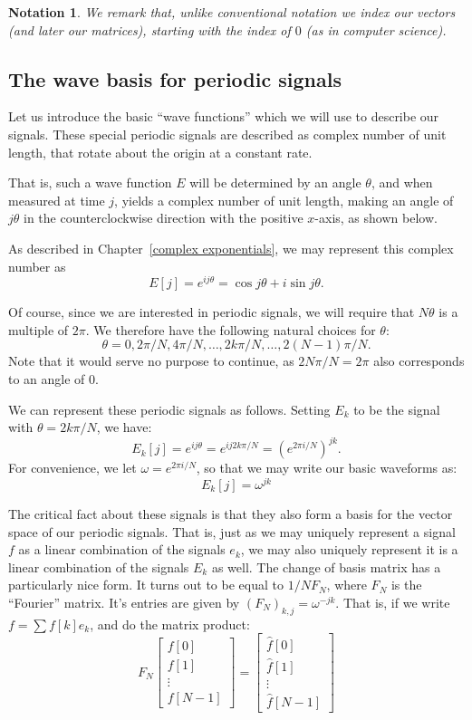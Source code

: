 \documentclass[12pt]{report}
\theoremstyle{plain}
\newtheorem{notn}[thm]{Notation}
\begin{document}
\begin{notn}
We remark that, unlike conventional notation we index our vectors (and later our matrices), starting with the index of $0$ (as in computer science).
\end{notn}

\subsection{The wave basis for periodic signals}

Let us introduce the basic ``wave functions'' which we will use to describe our signals. These special periodic signals are described as complex number of unit length, that rotate about the origin at a constant rate.

That is, such a wave function $E$ will be determined by an angle $\theta$, and when measured at time $j$, yields a complex number of unit length, making an angle of $j\theta$ in the counterclockwise direction with the positive $x$-axis, as shown below.

As described in Chapter~\ref{complex exponentials}, we may represent this complex number as 
\[E[j] = e^{ij\theta} = \cos{j\theta} + i \sin{j \theta}.\]

Of course, since we are interested in periodic signals, we will require that $N\theta$ is a multiple of $2\pi$. We therefore have the following natural choices for $\theta$:
\[\theta = 0, 2 \pi/N, 4 \pi / N, \ldots, 2k\pi/N, \ldots, 2(N-1)\pi/N.\]
Note that it would serve no purpose to continue, as $2N\pi/N = 2\pi$ also corresponds to an angle of $0$.

We can represent these periodic signals as follows. Setting $E_k$ to be the signal with $\theta= 2k\pi/N$, we have:
\[E_k[j] = e^{ij\theta} = e^{ij2k\pi/N} = \left(e^{2\pi i / N}\right)^{jk}. \]
For convenience, we let $\omega = e^{2 \pi i / N}$, so that we may write our basic waveforms as:
\[E_k[j] = \omega^{jk} \]

The critical fact about these signals is that they also form a basis for the vector space of our periodic signals. That is, just as we may uniquely represent a signal $f$ as a linear combination of the signals $e_k$, we may also uniquely represent it is a linear combination of the signals $E_k$ as well. The change of basis matrix has a particularly nice form. It turns out to be equal to $1/N F_N$, where $F_N$ is the ``Fourier'' matrix. It's entries are given by $(F_N)_{k,j} = \omega^{-jk}$. That is, if we write $f = \sum f[k] e_k$, and do the matrix product:
\[
F_N 
\left[
\begin{matrix}
	f[0] \\
	f[1] \\
	\vdots \\
	f[N-1]
\end{matrix}
\right]
=
\left[
\begin{matrix}
	\hat f[0] \\
	\hat f[1] \\
	\vdots \\
	\hat f[N-1]
\end{matrix}
\right]
\]
\end{document}
